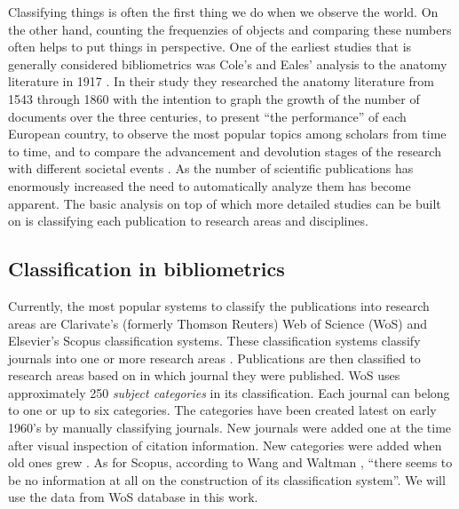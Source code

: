 Classifying things is often the first thing we do when we observe 
the world. On the other hand, counting the frequenzies of objects
and comparing these numbers often helps to put things in 
perspective.
One of the earliest studies that is generally considered
bibliometrics was Cole's and Eales' analysis to the anatomy 
literature in 1917 \cite{cole_history_1917}. In their study they 
researched the anatomy literature from 1543 through 1860 with the 
intention to graph the growth of the number of documents over 
the three centuries, to present ``the performance'' of each 
European country, to observe the most popular topics among 
scholars from time to time, and to compare the advancement and 
devolution stages of the research with different societal 
events \cite{bellis_bibliometrics_2009}.
As the number of scientific publications has enormously increased
the need to automatically analyze them has become apparent.
The basic analysis on top of which more detailed studies can be 
built on is classifying each publication to research areas and
disciplines.


\subsection{Classification in bibliometrics}
Currently, the most popular systems to classify the publications 
into research areas are Clarivate's (formerly Thomson Reuters)
Web of Science (WoS) and Elsevier's Scopus classification
systems. These classification systems classify journals into
one or more research areas \cite{waltman_new_2012}. Publications
are then classified to research areas based on in which journal they
were published. WoS uses approximately 250 \emph{subject categories}
in its classification. Each journal can belong 
to one or up to six categories. The categories have been created
latest on early 1960's by manually classifying journals.
New journals were added one at the time after visual inspection of
citation information. New categories were added when old ones
grew \cite{pudovkin_algorithmic_2002}. As for Scopus, according to 
Wang and Waltman \cite{wang_large-scale_2016}, ``there seems to be no 
information at all on the construction of its classification 
system''. We will use the data from WoS database in this work.

